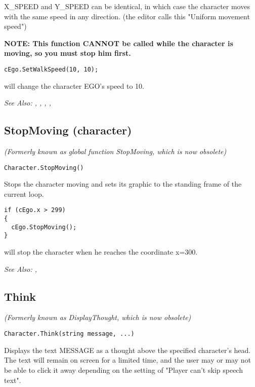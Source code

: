 X_SPEED and Y_SPEED can be identical, in which case the character moves with the same
speed in any direction. (the editor calls this "Uniform movement speed")

\bf{NOTE:} This function CANNOT be called while the character is moving, so
you must stop him first.

\begin{verbatim}
cEgo.SetWalkSpeed(10, 10);
\end{verbatim}
will change the character EGO's speed to 10.

\it{See Also:} ,
,
,
,



\subsection{StopMoving (character)}\label{Character.StopMoving}%

\it{(Formerly known as global function StopMoving, which is now obsolete)}

\begin{verbatim}
Character.StopMoving()
\end{verbatim}
Stops the character moving and sets its graphic to the standing frame of the current loop.

\begin{verbatim}
if (cEgo.x > 299)
{
  cEgo.StopMoving();
}
\end{verbatim}
will stop the character when he reaches the coordinate x=300.

\it{See Also:} , 


\subsection{Think}\label{Character.Think}%

\it{(Formerly known as DisplayThought, which is now obsolete)}

\begin{verbatim}
Character.Think(string message, ...)
\end{verbatim}
Displays the text MESSAGE as a thought above the specified character's head.
The text will remain on screen for a limited time, and the user may or may
not be able to click it away depending on the setting of "Player can't
skip speech text".

